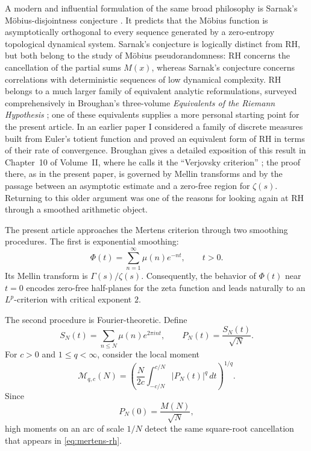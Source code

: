 \documentclass[11pt]{article}
\theoremstyle{remark}
\begin{document}
A modern and influential formulation of the same broad philosophy is
Sarnak's M\"obius-disjointness conjecture \cite{Sarnak}.  It predicts
that the M\"obius function is asymptotically orthogonal to every
sequence generated by a zero-entropy topological dynamical system.
Sarnak's conjecture is logically distinct from RH, but both belong to
the study of M\"obius pseudorandomness: RH concerns the cancellation of
the partial sums \(M(x)\), whereas Sarnak's conjecture concerns
correlations with deterministic sequences of low dynamical complexity.
RH belongs to a much larger family of equivalent analytic
reformulations, surveyed comprehensively in Broughan's three-volume
\emph{Equivalents of the Riemann Hypothesis}
\cite{BroughanI,BroughanII,BroughanIII}; one of these equivalents
supplies a more personal starting point for the present article.  In an
earlier paper \cite{VerjovskyDiscrete} I considered a family of
discrete measures built from Euler's totient function and proved an
equivalent form of RH in terms of their rate of convergence.  Broughan
gives a detailed exposition of this result in Chapter~10 of Volume~II,
where he calls it the ``Verjovsky criterion'' \cite[Ch.~10]{BroughanII};
the proof there, as in the present paper, is governed by Mellin
transforms and by the passage between an asymptotic estimate and a
zero-free region for \(\zeta(s)\).  Returning to this older argument
was one of the reasons for looking again at RH through a smoothed
arithmetic object.

The present article approaches the Mertens criterion through two
smoothing procedures.  The first is exponential smoothing:
\begin{equation}\label{eq:Phi-def}
\Phi(t)=\sum_{n=1}^{\infty}\mu(n)e^{-nt},
\qquad t>0.
\end{equation}
Its Mellin transform is \(\Gamma(s)/\zeta(s)\).  Consequently, the
behavior of \(\Phi(t)\) near \(t=0\) encodes zero-free half-planes for
the zeta function and leads naturally to an \(L^p\)-criterion with
critical exponent \(2\).

The second procedure is Fourier-theoretic.  Define
\begin{equation}\label{eq:PN-merged}
S_N(t)=\sum_{n\leq N}\mu(n)e^{2\pi int},
\qquad
P_N(t)=\frac{S_N(t)}{\sqrt N}.
\end{equation}
For \(c>0\) and \(1\leq q<\infty\), consider the local moment
\begin{equation}\label{eq:localmoment}
\mathcal M_{q,c}(N)
=
\left(
\frac{N}{2c}
\int_{-c/N}^{c/N}|P_N(t)|^q\,dt
\right)^{1/q}.
\end{equation}
Since
\[
P_N(0)=\frac{M(N)}{\sqrt N},
\]
high moments on an arc of scale \(1/N\) detect the same square-root
cancellation that appears in \eqref{eq:mertens-rh}.
\end{document}
